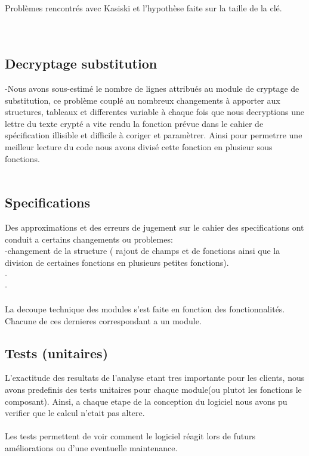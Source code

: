 \documentclass[a4]{article}
\begin{document}
 		Problèmes rencontrés avec Kasiski et l'hypothèse faite sur la taille de la clé. \\
  		 \\ \\
	
	\subsection{Decryptage substitution}
	-Nous avons sous-estimé le nombre de lignes attribués au module de cryptage de substitution,
	 ce problème couplé au nombreux changements à apporter aux structures, tableaux et differentes
	  variable à chaque fois que nous decryptions une lettre du texte crypté a vite rendu la fonction
	   prévue dans le cahier de spécification illisible et difficile à coriger et paramètrer. Ainsi 
	   pour permetrre une meilleur lecture du code nous avons divisé cette fonction en plusieur sous fonctions. \\ \\

	
		
		\subsection{Specifications}
		Des approximations et des erreurs de jugement sur le cahier des specifications ont conduit a certains changements ou problemes:\\
		-changement de la structure ( rajout de champs et de fonctions ainsi que la division de certaines fonctions en plusieurs
		 petites fonctions).\\
		-\\
		-\\ \\
		
		
		
		

		La decoupe technique des modules s'est faite en fonction des fonctionnalités.
		 Chacune de ces dernieres correspondant a un module.
		
		\subsection{Tests (unitaires)}
		L’exactitude des resultats de l'analyse etant tres importante pour les clients, nous avons predefinis des tests
unitaires pour chaque module(ou plutot les fonctions le composant). Ainsi, a chaque etape de la conception du logiciel
nous avons pu verifier que le calcul n’etait pas altere. \\ \\
Les tests permettent de voir comment le logiciel réagit lors de futurs améliorations ou d'une eventuelle maintenance. \\ 
 
\end{document}
